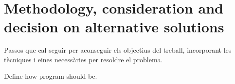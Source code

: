 \chapter{Methodology, consideration and decision on alternative solutions}

Passos que cal seguir per aconseguir els objectius del treball, incorporant les tècniques i eines necessàries per resoldre el problema.

Define how program should be.

